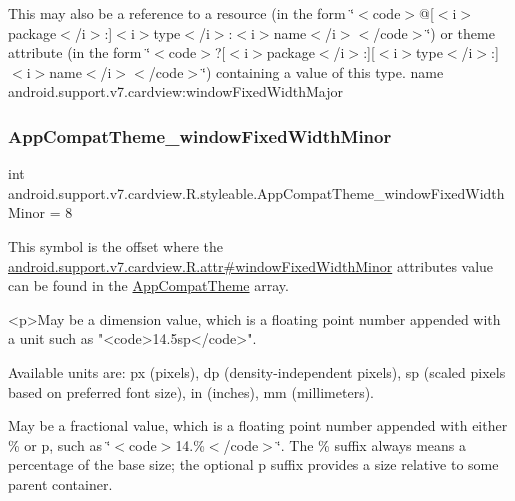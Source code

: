 This may also be a reference to a resource (in the form \char`\"{}$<$code$>$@\mbox{[}$<$i$>$package$<$/i$>$\+:\mbox{]}$<$i$>$type$<$/i$>$\+:$<$i$>$name$<$/i$>$$<$/code$>$\char`\"{}) or theme attribute (in the form \char`\"{}$<$code$>$?\mbox{[}$<$i$>$package$<$/i$>$\+:\mbox{]}\mbox{[}$<$i$>$type$<$/i$>$\+:\mbox{]}$<$i$>$name$<$/i$>$$<$/code$>$\char`\"{}) containing a value of this type.  name android.\+support.\+v7.\+cardview\+:window\+Fixed\+Width\+Major \mbox{\label{classandroid_1_1support_1_1v7_1_1cardview_1_1R_1_1styleable_a945c5aca64da7f328f2b9028ae826f73}} 
\subsubsection{\texorpdfstring{App\+Compat\+Theme\+\_\+window\+Fixed\+Width\+Minor}{AppCompatTheme\_windowFixedWidthMinor}}
{\footnotesize\ttfamily int android.\+support.\+v7.\+cardview.\+R.\+styleable.\+App\+Compat\+Theme\+\_\+window\+Fixed\+Width\+Minor = 8\hspace{0.3cm}{\ttfamily [static]}}

This symbol is the offset where the \hyperlink{classandroid_1_1support_1_1v7_1_1cardview_1_1R_1_1attr_ad2c7c50efea2d85ec1c001bd5a98c508}{android.\+support.\+v7.\+cardview.\+R.\+attr\#window\+Fixed\+Width\+Minor} attribute\textquotesingle{}s value can be found in the \hyperlink{classandroid_1_1support_1_1v7_1_1cardview_1_1R_1_1styleable_a52e6f69f954ecc2622d72c0b4d298938}{App\+Compat\+Theme} array.

\begin{DoxyVerb}      <p>May be a dimension value, which is a floating point number appended with a unit such as "<code>14.5sp</code>".
\end{DoxyVerb}
 Available units are\+: px (pixels), dp (density-\/independent pixels), sp (scaled pixels based on preferred font size), in (inches), mm (millimeters). 

May be a fractional value, which is a floating point number appended with either \% or p, such as \char`\"{}$<$code$>$14.\%$<$/code$>$\char`\"{}. The \% suffix always means a percentage of the base size; the optional p suffix provides a size relative to some parent container. 


